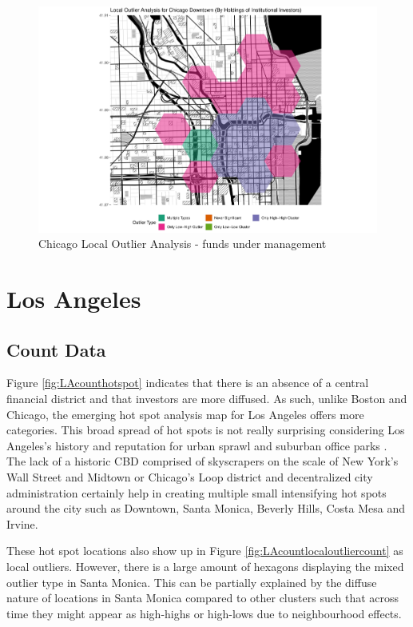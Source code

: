\begin{figure}
	\centering
	\includegraphics[width=1\linewidth]{Figures/ChapterIV/Chi_Money_LO_Downtown}
	\caption[Downtown Chicago Local Outlier Analysis - Funds Under Management 2013-2018]{Chicago Local Outlier Analysis - funds under management}
	\label{fig:Chicagolocaloutlier_Downtown}
\end{figure}

\section{Los Angeles}



\subsection{Count Data}

Figure \ref{fig:LAcounthotspot} indicates that there is an absence of a central financial district and that investors are more diffused.	As such, unlike Boston and Chicago, the emerging hot spot analysis map for Los Angeles offers more categories.  This broad spread of hot spots is not really surprising considering Los Angeles's history and reputation for urban sprawl and suburban office parks \citep{dearpostmodern1998,harrisconstructing1998}.  The lack of a historic CBD comprised of skyscrapers on the scale of New York's Wall Street and Midtown or Chicago's Loop district and decentralized city administration certainly help in creating multiple small intensifying hot spots around the city such as Downtown, Santa Monica, Beverly Hills, Costa Mesa and Irvine. 

These hot spot locations also show up in Figure \ref{fig:LAcountlocaloutliercount} as local outliers.  However, there is a large amount of hexagons displaying the  mixed outlier type in Santa Monica.  This can be partially explained by the diffuse nature of locations in Santa Monica compared to other clusters such that across time they might appear as high-highs or high-lows due to neighbourhood effects.  

